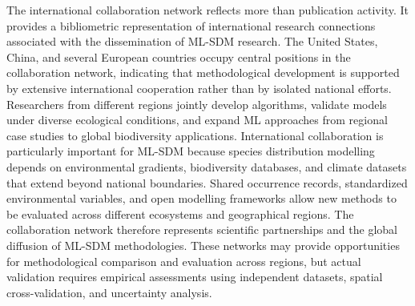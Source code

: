 \documentclass[authoryear,preprint,review,12pt]{elsarticle}
\begin{document}
The international collaboration network reflects more than publication activity. It provides a bibliometric representation of international research connections associated with the dissemination of ML-SDM research. The United States, China, and several European countries occupy central positions in the collaboration network, indicating that methodological development is supported by extensive international cooperation rather than by isolated national efforts. Researchers from different regions jointly develop algorithms, validate models under diverse ecological conditions, and expand ML approaches from regional case studies to global biodiversity applications. International collaboration is particularly important for ML-SDM because species distribution modelling depends on environmental gradients, biodiversity databases, and climate datasets that extend beyond national boundaries. Shared occurrence records, standardized environmental variables, and open modelling frameworks allow new methods to be evaluated across different ecosystems and geographical regions. The collaboration network therefore represents scientific partnerships and the global diffusion of ML-SDM methodologies. These networks may provide opportunities for methodological comparison and evaluation across regions, but actual validation requires empirical assessments using independent datasets, spatial cross-validation, and uncertainty analysis. 
\end{document}
